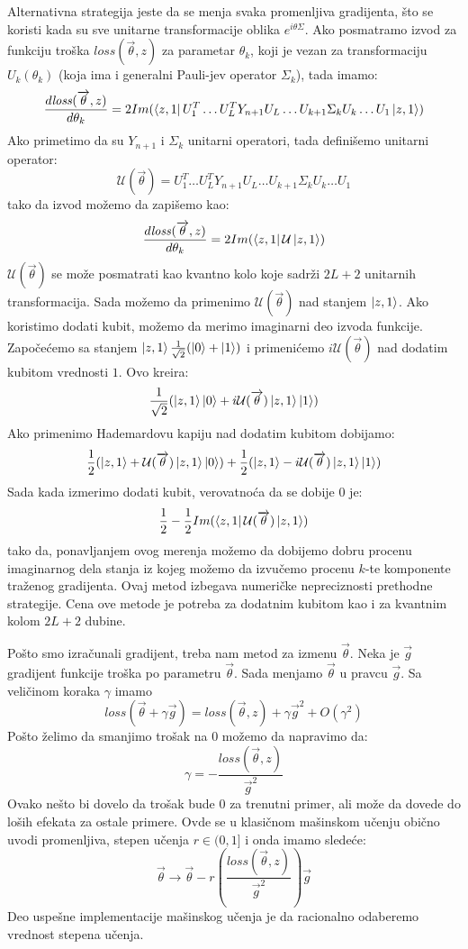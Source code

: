 \documentclass[12pt, letterpaper, oneside]{article}
\begin{document}
Alternativna strategija jeste da se menja svaka promenljiva gradijenta, što se koristi kada su sve unitarne transformacije oblika $e^{i\theta\Sigma}$.
Ako posmatramo izvod za funkciju troška $\mathit{loss}(\overrightarrow{\theta},z)$ za parametar $\theta_k$, koji je vezan za transformaciju $U_k(\theta_k)$
(koja ima i generalni Pauli-jev operator $\Sigma_k$), tada imamo:
\[
    \frac{d\mathit{loss}(\overrightarrow{\theta},z)}{d\theta_k} = 2Im(\Bra{z,1}U_1^T \dots U_L^TY_{n+1}U_L \dots U_{k+1} \Sigma_k U_k \dots U_1 \Ket{z,1})
\]
Ako primetimo da su $Y_{n+1}$ i $\Sigma_k$ unitarni operatori, tada definišemo unitarni operator:
\[
    \mathcal{U}(\overrightarrow{\theta}) = U_1^T \dots U_L^TY_{n+1}U_L \dots U_{k+1} \Sigma_k U_k \dots U_1
\]
tako da izvod možemo da zapišemo kao:
\[
    \frac{d\mathit{loss}(\overrightarrow{\theta},z)}{d\theta_k} = 2Im(\Bra{z,1}\mathcal{U}\Ket{z,1})
\]
$\mathcal{U}(\overrightarrow{\theta})$ se može posmatrati kao kvantno kolo koje sadrži $2L+2$ unitarnih transformacija.
Sada možemo da primenimo $\mathcal{U}(\overrightarrow{\theta})$ nad stanjem $\Ket{z,1}$. Ako koristimo dodati kubit, možemo da merimo imaginarni deo
izvoda funkcije. Započećemo sa stanjem $\Ket{z,1}\frac{1}{\sqrt{2}}(\Ket{0}+\Ket{1})$ i primenićemo $i\mathcal{U}(\overrightarrow{\theta})$ nad dodatim kubitom vrednosti $1$.
Ovo kreira:
\[
    \frac{1}{\sqrt{2}}(\Ket{z,1}\Ket{0} + i\mathcal{U}(\overrightarrow{\theta})\Ket{z,1}\Ket{1})
\]
Ako primenimo Hademardovu kapiju nad dodatim kubitom dobijamo:
\[
    \frac{1}{2}(\Ket{z,1}+\mathcal{U}(\overrightarrow{\theta})\Ket{z,1}\Ket{0}) + \frac{1}{2}(\Ket{z,1}-i\mathcal{U}(\overrightarrow{\theta})\Ket{z,1}\Ket{1})
\]
Sada kada izmerimo dodati kubit, verovatnoća da se dobije $0$ je:
\[
    \frac{1}{2} - \frac{1}{2}Im(\bra{z,1}\mathcal{U}(\overrightarrow{\theta})\Ket{z,1})
\]
tako da, ponavljanjem ovog merenja možemo da dobijemo dobru procenu imaginarnog dela stanja iz kojeg možemo da izvučemo procenu $k$-te komponente traženog gradijenta.
Ovaj metod izbegava numeričke nepreciznosti prethodne strategije. Cena ove metode je potreba za dodatnim kubitom kao i za kvantnim kolom $2L+2$ dubine.

Pošto smo izračunali gradijent, treba nam metod za izmenu $\overrightarrow{\theta}$. Neka je $\overrightarrow{g}$ gradijent funkcije troška po parametru $\overrightarrow{\theta}$.
Sada menjamo $\overrightarrow{\theta}$ u pravcu $\overrightarrow{g}$. Sa veličinom koraka $\gamma$ imamo
\[
    \mathit{loss}(\overrightarrow{\theta}+\gamma \overrightarrow{g}) = \mathit{loss}(\overrightarrow{\theta},z)+ \gamma \overrightarrow{g}^2 + O(\gamma^2)
\]
Pošto želimo da smanjimo trošak na $0$ možemo da napravimo da:
\[
    \gamma = -\frac{\mathit{loss}(\overrightarrow{\theta},z)}{\overrightarrow{g}^2}
\]
Ovako nešto bi dovelo da trošak bude $0$ za trenutni primer, ali može da dovede do loših efekata za ostale primere.
Ovde se u klasičnom mašinskom učenju obično uvodi promenljiva, stepen učenja $r \in (0,1]$ i onda imamo sledeće:
\[
    \overrightarrow{\theta} \to \overrightarrow{\theta} - r(\frac{\mathit{loss}(\overrightarrow{\theta},z)}{\overrightarrow{g}^2})\overrightarrow{g}
\]
Deo uspešne implementacije mašinskog učenja je da racionalno odaberemo vrednost stepena učenja.
\end{document}
